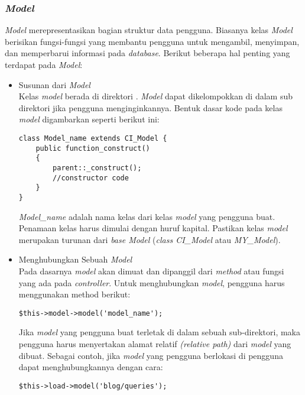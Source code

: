 	\subsubsection{\textit{Model}}
	\textit{Model} merepresentasikan bagian struktur data pengguna. Biasanya kelas \textit{Model} berisikan fungsi-fungsi yang membantu pengguna untuk mengambil, menyimpan, dan memperbarui informasi pada \textit{database}. Berikut beberapa hal penting yang terdapat pada \textit{Model}:
	\begin{itemize}
		\item Susunan dari \textit{Model} \\
		Kelas \textit{model} berada di direktori . \textit{Model} dapat dikelompokkan di dalam sub direktori jika pengguna menginginkannya. Bentuk dasar kode pada kelas \textit{model} digambarkan seperti berikut ini:
		\begin{lstlisting}[basicstyle=\ttfamily, frame=single,
columns=fullflexible, keepspaces=true, breaklines=true]
class Model_name extends CI_Model {
	public function_construct()
	{
		parent::_construct();
		//constructor code
	}
}
\end{lstlisting}
		
		\textit{Model\_name} adalah nama kelas dari kelas \textit{model} yang pengguna buat. Penamaan kelas harus dimulai dengan huruf kapital. Pastikan kelas \textit{model} merupakan turunan dari \textit{base Model} (\textit{class CI\_Model} atau \textit{MY\_Model}).
		
		\item Menghubungkan Sebuah \textit{Model} \\
		Pada dasarnya \textit{model} akan dimuat dan dipanggil dari \textit{method} atau fungsi yang ada pada \textit{controller}. Untuk menghubungkan \textit{model}, pengguna harus menggunakan method berikut:
		\begin{lstlisting}[basicstyle=\ttfamily, frame=single,
columns=fullflexible, keepspaces=true, breaklines=true]
$this->model->model('model_name');
\end{lstlisting}
		
		Jika \textit{model} yang pengguna buat terletak di dalam sebuah sub-direktori, maka pengguna harus menyertakan alamat relatif \textit{(relative path)} dari \textit{model} yang dibuat. Sebagai contoh, jika \textit{model} yang pengguna berlokasi di  pengguna dapat menghubungkannya dengan cara:
		\begin{lstlisting}[basicstyle=\ttfamily, frame=single,
columns=fullflexible, keepspaces=true, breaklines=true]
$this->load->model('blog/queries');
\end{lstlisting}
		

\end{itemize}
